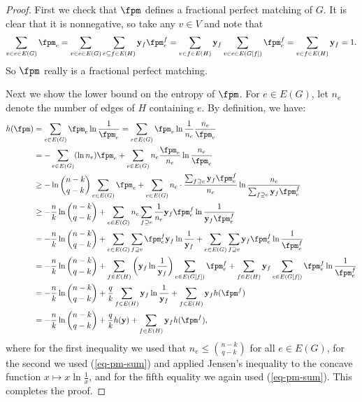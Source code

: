 \documentclass[11pt]{article}
\newcommand{\fpmy}{\mathbf{y}}
\begin{document}
\begin{proof}
    First we check that $\fpm$ defines a fractional perfect matching of $G$. It is clear that it is nonnegative, so take any $v\in V$ and note that
    $$\sum_{v\in e\in E(G)}\fpm_e=\sum_{v\in e\in E(G)}\sum_{e\subseteq f\in E(H)} \fpmy_f\fpm^f_e=\sum_{v\in f\in E(H)}\fpmy_f\sum_{v\in e\in E(G[f])}\fpm^f_e = \sum_{v\in f\in E(H)}\fpmy_f=1.$$
    So $\fpm$ really is a fractional perfect matching.

    Next we show the lower bound on the entropy of $\fpm$. For $e\in E(G)$, let $n_e$ denote the number of edges of $H$ containing $e$. By definition, we have:
    \begin{align*} 
        h(\fpm) &=\sum_{e\in E(G)}\fpm_e\ln\frac{1}{\fpm_e} = \sum_{e\in E(G)}\fpm_e\ln\frac{1}{n_e }\frac{n_e }{\fpm_e} \\
        &= -\sum_{e\in E(G)}(\ln n_e)\fpm_e + \sum_{e\in E(G)}n_e\frac{\fpm_e}{n_e}\ln\frac{n_e }{\fpm_e} \\
        &\ge -\ln\binom{n-k}{q-k}\sum_{e\in E(G)}\fpm_e +\sum_{e\in E(G)}n_e\cdot\frac{\sum_{f\supseteq e}\fpmy_f\fpm^f_e}{n_e}\ln\frac{n_e }{\sum_{f\supseteq e}\fpmy_f\fpm^f_e} \\
        &\ge -\frac{n }{k }\ln\binom{n-k}{q-k} + \sum_{e\in E(G)}n_e\sum_{f\supseteq e}\frac{1}{n_e }\fpmy_f\fpm^f_e\ln\frac{1}{\fpmy_f\fpm^f_e} \\
        &= -\frac{n }{k }\ln\binom{n-k}{q-k} + \sum_{e\in E(G)}\sum_{f\supseteq e}\fpm^f_e\fpmy_f\ln\frac{1}{\fpmy_f} + \sum_{e\in E(G)}\sum_{f\supseteq e}\fpmy_f\fpm^f_e\ln\frac{1}{\fpm^f_e} \\
        &= -\frac{n }{k }\ln\binom{n-k}{q-k} + \sum_{f\in E(H)}\left(\fpmy_f\ln\frac{1}{\fpmy_f}\right)\sum_{e\in E(G[f])}\fpm^f_e + \sum_{f\in E(H)}\fpmy_f\sum_{e\in E(G[f])}\fpm^f_e\ln\frac{1}{\fpm^f_e} \\
        &= -\frac{n }{k }\ln\binom{n-k}{q-k} + \frac{q }{k }\sum_{f\in E(H)}\fpmy_f\ln\frac{1}{\fpmy_f} + \sum_{f\in E(H)}\fpmy_f h(\fpm^f) \\
        &= -\frac{n }{k }\ln\binom{n-k}{q-k} + \frac{q }{k }h(\fpmy) + \sum_{f\in E(H)}\fpmy_f h(\fpm^f),
    \end{align*}
    where for the first inequality we used that $n_e\le \binom{n-k}{q-k}$ for all $e\in E(G)$, for the second we used (\ref{eq-pm-sum}) and applied Jensen's inequality to the concave function $x\mapsto x\ln\frac{1}{x}$, and for the fifth equality we again used (\ref{eq-pm-sum}). This completes the proof.
\end{proof}
\end{document}
